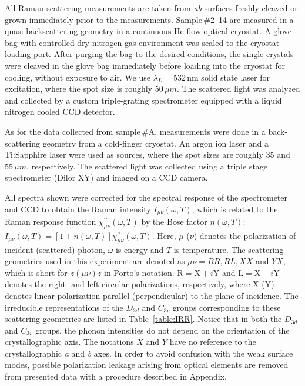 \documentclass[reprint,aps,pra,superscriptaddress,amsmath,amssymb,linenumbers,longbibliography]{revtex4-1}
\begin{document}
All Raman scattering measurements are taken from \textit{ab} surfaces freshly cleaved or grown immediately prior to the measurements.
Sample\,\#2--14 are measured in a quasi-backscattering geometry in a continuous He-flow optical cryostat.
A glove bag with controlled dry nitrogen gas environment was sealed to the cryostat loading port. 
After purging the bag to the desired conditions, the single crystals were cleaved in the glove bag immediately before loading into the cryostat for cooling, without exposure to air. 
We use $\lambda_L=$532\,nm solid state laser for excitation, where the spot size is roughly $50\,\mu m$.
The scattered light was analyzed and collected by a custom triple-grating spectrometer equipped with a liquid nitrogen cooled CCD detector.

As for the data collected from sample\,\#A, measurements were done in a back-scattering geometry from a cold-finger cryostat.
An argon ion laser and a Ti:Sapphire laser were used as sources, where the spot sizes are roughly 35 and 55\,$\mu m$, respectively. 
The scattered light was collected using a triple stage spectrometer (Dilor XY) and imaged on a CCD camera.

All spectra shown were corrected for the spectral response of the spectrometer 
and CCD to obtain the Raman intensity $I_{\mu\nu}(\omega,T)$, which is related to the Raman response function $\chi_{\mu\nu}^{\prime\prime}(\omega,T)$ by the Bose factor $n(\omega,T)$:
$I_{\mu\nu}(\omega,T)=[1+n(\omega,T)]\chi_{\mu\nu}^{\prime\prime}(\omega,T)$.
Here, $\mu$ ($\nu$) denotes the polarization of incident (scattered) photon, $\omega$ is energy and $T$ is temperature.
The scattering geometries used in this experiment are denoted as $\mu\nu = RR, RL, XX$ and $YX$, which is short for $\overline{z}(\mu\nu)z$ in Porto's notation.
$\text{R}=\text{X}+i\text{Y}$ and $\text{L}=\text{X}-i\text{Y}$ denotes the right- and left-circular polarizations, respectively, where X (Y) denotes linear polarization parallel (perpendicular) to the plane of incidence.
The irreducible representations of the $D_{3d}$ and $C_{3v}$ groups corresponding to these scattering geometries are listed in Table~\ref{table:IRR}.
Notice that in both the $D_{3d}$ and $C_{3v}$ groups, the phonon intensities do not depend on the orientation of the crystallographic axis.
The notations $X$ and $Y$ have no reference to the crystallographic \textit{a} and \textit{b} axes.
In order to avoid confusion with the weak surface modes, possible polarization leakage arising from optical elements are removed from presented data with a procedure described in Appendix.
\end{document}
